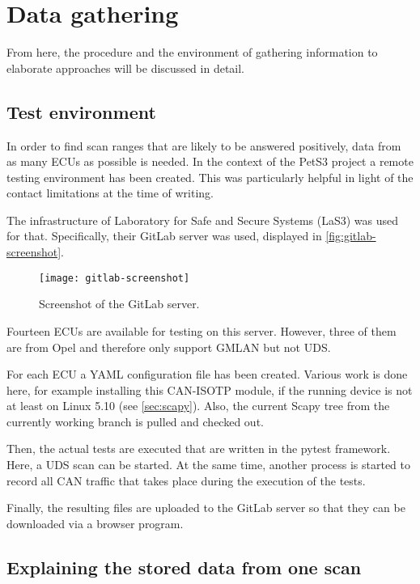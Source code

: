 \section{Data gathering}
\label{sec:data-gathering}

From here, the procedure and the environment of gathering information to elaborate approaches will be discussed in detail.

\subsection{Test environment}

In order to find scan ranges that are likely to be answered positively, data from as many ECUs as possible is needed. In the context of the PetS3 project a remote testing environment has been created. This was particularly helpful in light of the contact limitations at the time of writing.

The infrastructure of Laboratory for Safe and Secure Systems (LaS3) was used for that. Specifically, their GitLab server was used, displayed in \autoref{fig:gitlab-screenshot}.

\begin{figure}[h]
    \centering
    \texttt{[image: gitlab-screenshot]}
    \caption{Screenshot of the GitLab server.}
    \label{fig:gitlab-screenshot}
\end{figure}

Fourteen ECUs are available for testing on this server. However, three of them are from Opel and therefore only support GMLAN but not UDS.

For each ECU a YAML configuration file has been created. Various work is done here, for example installing this CAN-ISOTP module, if the running device is not at least on Linux 5.10 (see \autoref{sec:scapy}). Also, the current Scapy tree from the currently working branch is pulled and checked out.

Then, the actual tests are executed that are written in the pytest framework. Here, a UDS scan can be started. At the same time, another process is started to record all CAN traffic that takes place during the execution of the tests.

Finally, the resulting files are uploaded to the GitLab server so that they can be downloaded via a browser program.

\subsection{Explaining the stored data from one scan}

